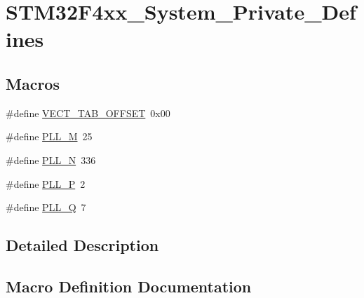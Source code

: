 \hypertarget{group___s_t_m32_f4xx___system___private___defines}{}\section{S\+T\+M32\+F4xx\+\_\+\+System\+\_\+\+Private\+\_\+\+Defines}
\label{group___s_t_m32_f4xx___system___private___defines}
\subsection*{Macros}
\begin{DoxyCompactItemize}
\item 
\#define \mbox{\hyperlink{group___s_t_m32_f4xx___system___private___defines_ga40e1495541cbb4acbe3f1819bd87a9fe}{V\+E\+C\+T\+\_\+\+T\+A\+B\+\_\+\+O\+F\+F\+S\+ET}}~0x00
\item 
\#define \mbox{\hyperlink{group___s_t_m32_f4xx___system___private___defines_ga0fa5a868f5cd056a04b1c42e454b9617}{P\+L\+L\+\_\+M}}~25
\item 
\#define \mbox{\hyperlink{group___s_t_m32_f4xx___system___private___defines_ga04586ea638d21afe558db4f2798c38a6}{P\+L\+L\+\_\+N}}~336
\item 
\#define \mbox{\hyperlink{group___s_t_m32_f4xx___system___private___defines_ga290dcd27167e925d817e8334111c1c01}{P\+L\+L\+\_\+P}}~2
\item 
\#define \mbox{\hyperlink{group___s_t_m32_f4xx___system___private___defines_gac958257ddb2537c539cffdb3a4543067}{P\+L\+L\+\_\+Q}}~7
\end{DoxyCompactItemize}


\subsection{Detailed Description}


\subsection{Macro Definition Documentation}
\mbox{\label{group___s_t_m32_f4xx___system___private___defines_ga0fa5a868f5cd056a04b1c42e454b9617}} 

